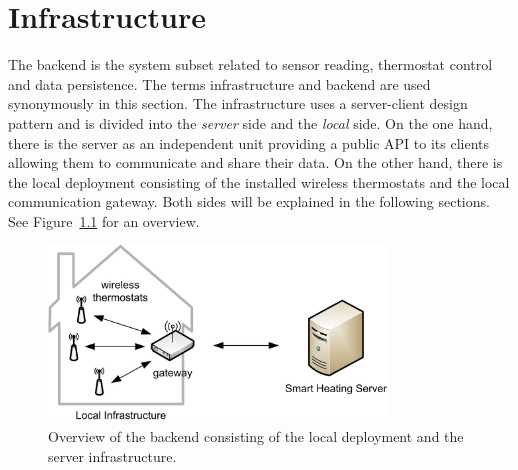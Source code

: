 
\chapter{Infrastructure}
\label{sec:infrastructure}



The backend is the system subset related to sensor reading, thermostat control and data persistence.
The terms infrastructure and backend are used synonymously in this section.
The infrastructure uses a server-client design pattern and is divided into the \emph{server} side and the \emph{local} side.
On the one hand, there is the server as an independent unit providing a public API to its clients allowing them to communicate and share their data.
On the other hand, there is the local deployment consisting of the installed wireless thermostats and the local communication gateway.
Both sides will be explained in the following sections.
See Figure~\ref{fig:backend} for an overview.

\begin{figure}[h]
	\begin{center}
		\includegraphics[width=0.8\textwidth]{images/Backend.png}
	\end{center}
	\caption{Overview of the backend consisting of the local deployment and the server infrastructure.}
	\label{fig:backend}
\end{figure}
